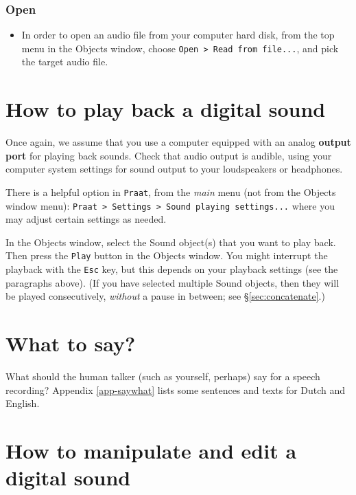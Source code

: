 \documentclass[
]{book}
\providecommand{\tightlist}{%
  \setlength{\itemsep}{0pt}\setlength{\parskip}{0pt}}
\begin{document}
\subsubsection{Open}\label{sec:praatopen}

\begin{itemize}
\tightlist
\item
  In order to open an audio file from your computer hard disk, from the top menu in the Objects window, choose \texttt{Open\ \textgreater{}\ Read\ from\ file...}, and pick the target audio file.
\end{itemize}

\section{How to play back a digital sound}\label{sec:playback}

Once again, we assume that you use a computer equipped with an analog \textbf{output port} for playing back sounds. Check that audio output is audible, using your computer system settings for sound output to your loudspeakers or headphones.

There is a helpful option in \texttt{Praat}, from the \emph{main} menu (not from the Objects window menu): \texttt{Praat\ \textgreater{}\ Settings\ \textgreater{}\ Sound\ playing\ settings...} where you may adjust certain settings as needed.

\protect{}\label{box-praatplay}
In the Objects window, select the Sound object(s) that you want to play back. Then press the \texttt{Play} button in the Objects window. You might interrupt the playback with the \texttt{Esc} key, but this depends on your playback settings (see the paragraphs above). (If you have selected multiple Sound objects, then they will be played consecutively, \emph{without} a pause in between; see §\ref{sec:concatenate}.)

\section{What to say?}\label{sec:whattosay}

What should the human talker (such as yourself, perhaps) say for a speech recording? Appendix \ref{app-saywhat} lists some sentences and texts for Dutch and English.

\section{How to manipulate and edit a digital sound}\label{how-to-manipulate-and-edit-a-digital-sound}
\end{document}
